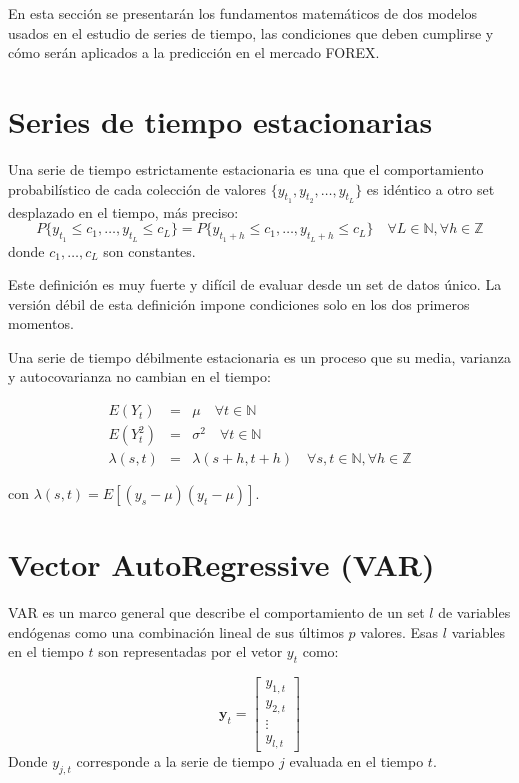 En esta sección se presentarán los fundamentos matemáticos de dos modelos
usados en el estudio de series de tiempo, las condiciones que deben cumplirse y 
cómo serán aplicados a la predicción en el mercado FOREX. 

\section{Series de tiempo estacionarias}
Una serie de tiempo estrictamente estacionaria es una que el comportamiento
probabilístico de cada colección de valores $\{y_{t_1},y_{t_2},\dots,y_{t_L}\}$
es idéntico
a otro set desplazado en el tiempo, más preciso: \[ P\{y_{t_1} \leq
c_1,\dots,y_{t_L} \leq c_L\} = P\{y_{t_1+h} \leq c_1,\dots,y_{t_L+h}
\leq c_L\}
\quad \forall L \in \mathbb{N}, \forall h \in \mathbb{Z}\] \noindent donde
$c_1,\dots,c_L$ son constantes.

Este definición es muy fuerte y difícil de evaluar desde un set de datos único.
La versión débil de esta definición impone condiciones solo en los dos primeros
momentos.

Una serie de tiempo débilmente estacionaria es un proceso que su media,
varianza y autocovarianza no cambian en el tiempo:

\begin{eqnarray*}
E(Y_t) &=& \mu  \quad \forall t \in \mathbb{N} \\ E(Y^2_t) &=&
\sigma^2  \quad \forall t \in \mathbb{N} \\
\lambda(s,t)&=&\lambda(s+h,t+h) \quad \forall s,t \in \mathbb{N},
\forall h \in \mathbb{Z}
\end{eqnarray*}

\noindent con $\lambda(s,t) = E[(y_s-\mu)(y_t - \mu)]$.

\section{Vector AutoRegressive (VAR)}

VAR es un marco general que describe el comportamiento de un set $l$ de
variables endógenas como una combinación lineal de sus últimos $p$ valores.
Esas $l$ variables en el tiempo $t$ son representadas por el vetor $y_t$ como:

\begin{equation}
\label{eq:variables}
\mathbf{y}_t = 
\begin{bmatrix} y_{1,t} \\
y_{2,t} \\
\vdots \\
y_{l,t}
\end{bmatrix}
\end{equation}
\noindent Donde $y_{j,t}$ corresponde a la serie de tiempo $j$ evaluada en el
tiempo $t$.

